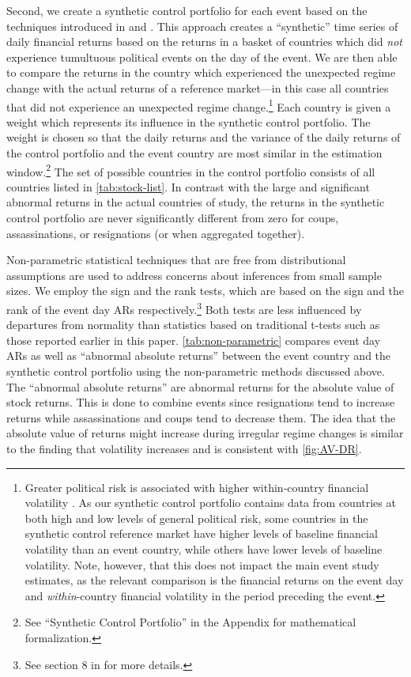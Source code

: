 \documentclass[12pt,final,fleqn]{article}
\theoremstyle{plain}
\begin{document}
Second, we create a synthetic control portfolio for each event based on the techniques introduced in \citet{abadie2003economic} and \citet{abadie2010synthetic}. This approach creates a ``synthetic'' time series of daily financial returns based on the returns in a basket of countries which did \textit{not} experience tumultuous political events on the day of the event. We are then able to compare the returns in the country which experienced the unexpected regime change with the actual returns of a reference market---in this case all countries that did not experience an unexpected regime change.\footnote{Greater political risk is associated with higher within-country financial volatility \citep{boutchkova2012precarious}. As our synthetic control portfolio contains data from countries at both high and low levels of general political risk, some countries in the synthetic control reference market  have higher levels of baseline financial volatility than an event country, while others have lower levels of baseline volatility. Note, however, that this does not impact the main event study estimates, as the relevant comparison is the financial returns on the event day and \textit{within}-country financial volatility in the period preceding the event.} Each country is given a weight which represents its influence in the synthetic control portfolio. The weight is chosen so that the daily returns and the variance of the daily returns of the control portfolio and the event country are most similar in the estimation window.\footnote{See ``Synthetic Control Portfolio'' in the Appendix for mathematical formalization.} The set of possible countries in the control portfolio consists of all countries listed in \autoref{tab:stock-list}. In contrast with the large and significant abnormal returns in the actual countries of study, the returns in the synthetic control portfolio are never significantly different from zero for coups, assassinations, or resignations (or when aggregated together).

Non-parametric statistical techniques that are free from distributional assumptions are used to address concerns about inferences from small sample sizes. We employ the sign and the rank tests, which are based on the sign and the rank of the event day ARs respectively.\footnote{See section 8 in \citet{mackinlay1997event} for more details.} Both tests are less influenced by departures from normality than statistics based on traditional t-tests such as those reported earlier in this paper. \autoref{tab:non-parametric} compares event day ARs as well as ``abnormal absolute returns'' between the event country and the synthetic control portfolio using the non-parametric methods discussed above. The ``abnormal absolute returns'' are abnormal returns for the absolute value of stock returns. This is done to combine events since resignations tend to increase returns while assassinations and coups tend to decrease them. The idea that the absolute value of returns might increase during irregular regime changes is similar to the finding that volatility increases and is consistent with \autoref{fig:AV-DR}.
\end{document}
